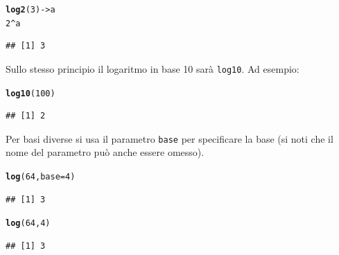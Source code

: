 \documentclass[onecolumn,11pt]{book}\usepackage[]{graphicx}\usepackage[]{color}
\makeatletter
\newcommand{\hlnum}[1]{\textcolor[rgb]{0.686,0.059,0.569}{#1}}%
\newcommand{\hlopt}[1]{\textcolor[rgb]{0,0,0}{#1}}%
\newcommand{\hlstd}[1]{\textcolor[rgb]{0.345,0.345,0.345}{#1}}%
\newcommand{\hlkwb}[1]{\textcolor[rgb]{0.69,0.353,0.396}{#1}}%
\newcommand{\hlkwc}[1]{\textcolor[rgb]{0.333,0.667,0.333}{#1}}%
\newcommand{\hlkwd}[1]{\textcolor[rgb]{0.737,0.353,0.396}{\textbf{#1}}}%
\newenvironment{kframe}{%
 \def\at@end@of@kframe{}%
 \ifinner\ifhmode%
  \def\at@end@of@kframe{\end{minipage}}%
  \begin{minipage}{\columnwidth}%
 \fi\fi%
 \def\FrameCommand##1{\hskip\@totalleftmargin \hskip-\fboxsep
 \colorbox{shadecolor}{##1}\hskip-\fboxsep
     \hskip-\linewidth \hskip-\@totalleftmargin \hskip\columnwidth}%
 \MakeFramed {\advance\hsize-\width
   \@totalleftmargin\z@ \linewidth\hsize
   \@setminipage}}%
 {\par\unskip\endMakeFramed%
 \at@end@of@kframe}
\newenvironment{knitrout}{}{} %
\makeatother
\begin{document}
\begin{itemize}
\begin{knitrout}
\color{fgcolor}\begin{kframe}
\begin{alltt}
\hlkwd{log2}\hlstd{(}\hlnum{3}\hlstd{)}\hlkwb{->}\hlstd{a}
\hlnum{2}\hlopt{^}\hlstd{a}
\end{alltt}
\begin{verbatim}
## [1] 3
\end{verbatim}
\end{kframe}
\end{knitrout}
Sullo stesso principio il logaritmo in base 10 sar\`a
\texttt{log10}. Ad
esempio:
\begin{knitrout}
\color{fgcolor}\begin{kframe}
\begin{alltt}
\hlkwd{log10}\hlstd{(}\hlnum{100}\hlstd{)}
\end{alltt}
\begin{verbatim}
## [1] 2
\end{verbatim}
\end{kframe}
\end{knitrout}
Per basi diverse si usa il parametro \texttt{base} per specificare la base (si noti che il nome del parametro pu\`o anche essere omesso).
\begin{knitrout}
\color{fgcolor}\begin{kframe}
\begin{alltt}
\hlkwd{log}\hlstd{(}\hlnum{64}\hlstd{,}\hlkwc{base}\hlstd{=}\hlnum{4}\hlstd{)}
\end{alltt}
\begin{verbatim}
## [1] 3
\end{verbatim}
\begin{alltt}
\hlkwd{log}\hlstd{(}\hlnum{64}\hlstd{,}\hlnum{4}\hlstd{)}
\end{alltt}
\begin{verbatim}
## [1] 3
\end{verbatim}
\end{kframe}
\end{knitrout}


\end{itemize}
\end{document}
